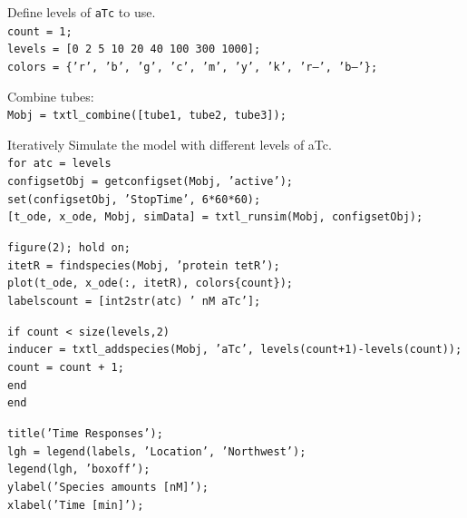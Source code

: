 \documentclass[english]{report}
\begin{document}
		Define levels of \texttt{aTc} to use. \\						
\noindent \texttt{count = 1;}\\
\texttt{levels = [0 2 5 10 20 40 100 300 1000];}\\
\texttt{colors = \{'r', 'b', 'g', 'c', 'm', 'y', 'k', 'r--', 'b--'\};}
\vspace*{1\baselineskip}
								
		Combine tubes: \\						
\noindent \texttt{Mobj = txtl\_combine([tube1, tube2, tube3]);}
\vspace*{1\baselineskip}
								
		Iteratively Simulate the model with different levels of aTc. \\						
\noindent \texttt{for atc = levels }\\
 \texttt{configsetObj = getconfigset(Mobj, 'active');}\\
  \texttt{set(configsetObj, 'StopTime', 6*60*60);  }\\
  \texttt{[t\_ode, x\_ode, Mobj, simData] = txtl\_runsim(Mobj, configsetObj); }
\vspace*{1\baselineskip}
								
\noindent \texttt{figure(2); hold on;}\\
  \texttt{itetR = findspecies(Mobj, 'protein tetR');}\\
  \texttt{plot(t\_ode, x\_ode(:, itetR), colors\{count\});}\\
  \texttt{labels{count} = [int2str(atc) ' nM aTc'];}
								\vspace*{1\baselineskip}
								
  \noindent \texttt{if count < size(levels,2)}\\
  \texttt{inducer = txtl\_addspecies(Mobj, 'aTc', levels(count+1)-levels(count));}\\
  \texttt{count = count + 1;}\\
  \texttt{end}\\
\texttt{end}
	\vspace*{1\baselineskip}
								
\noindent \texttt{title('Time Responses');}\\
\texttt{lgh = legend(labels, 'Location', 'Northwest');}\\
\texttt{legend(lgh, 'boxoff');}\\
\texttt{ylabel('Species amounts [nM]');}\\
\texttt{xlabel('Time [min]');}
\end{document}
